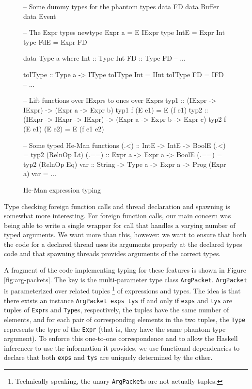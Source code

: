 \documentclass[preprint]{sigplanconf}
\renewcommand{\t}{\texttt}
\begin{document}
\begin{figure}[ht]
\centering
\begin{code}
-- Some dummy types for the phantom types
data FD
data Buffer
data Event

-- The Expr types
newtype Expr a = E IExpr
type IntE = Expr Int
type FdE = Expr FD

data Type a where
  Int :: Type Int
  FD :: Type FD
  -- ...

toIType :: Type a -> IType
toIType Int = IInt
toIType FD = IFD
-- ...

-- Lift functions over IExprs to ones over Exprs
typ1 :: (IExpr -> IExpr) -> (Expr a -> Expr b)
typ1 f (E e1) = E (f e1)
typ2 :: (IExpr -> IExpr -> IExpr) ->
        (Expr a -> Expr b -> Expr c)
typ2 f (E e1) (E e2) = E (f e1 e2)

-- Some typed He-Man functions
(.<) :: IntE -> IntE -> BoolE
(.<) = typ2 (RelnOp Lt)
(.==) :: Expr a -> Expr a -> BoolE
(.==) = typ2 (RelnOp Eq)
var :: String -> Type a -> Expr a -> Prog (Expr a)
var = ...
\end{code}
\caption{He-Man expression typing} %
\label{fig:types}
\end{figure}

Type checking foreign function calls and thread declaration and
spawning is somewhat more interesting.  For foreign function calls,
our main concern was being able to write a single wrapper for call
that handles a varying number of typed arguments. We want more than
this, however: we want to ensure that both the code for a declared
thread uses its arguments properly at the declared types code and that
spawning threads provides arguments of the correct types.

A fragment of the code implementing typing for these features is shown
in Figure \ref{fig:arg-packets}. The key is the multi-parameter type
class \t{ArgPacket}. \t{ArgPacket} is parameterized over related
tuples \footnote{Technically speaking, the unary \t{ArgPacket}s are
  not actually tuples.} of expressions and types. The idea is that
there exists an instance \t{ArgPacket exps tys} if and only if
\t{exps} and \t{tys} are tuples of \t{Expr}s and \t{Type}s,
respectively, the tuples have the same number of elements, and for
each pair of corresponding elements in the two tuples, the \t{Type}
represents the type of the \t{Expr} (that is, they have the same
phantom type argument). To enforce this one-to-one correspondence and
to allow the Haskell inferencer to use the information it provides, we
use functional dependencies %
to declare that both \t{exps} and \t{tys} are uniquely determined by
the other.
\end{document}
